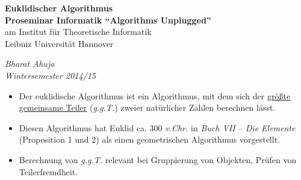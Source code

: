 \documentclass[12pt]{article}
\begin{document}
\begin{center}
\textbf{Euklidischer Algorithmus\\}
\textbf{Proseminar Informatik ``Algorithms Unplugged''}\\
am Institut f\"ur Theoretische Informatik\\
Leibniz Universit\"at Hannover\\
\end{center}
\begin{flushright}
\textit{Bharat Ahuja\\Wintersemester 2014/15}
\end{flushright}

\noindent\makebox[\linewidth]{\rule{\paperwidth}{0.4pt}}
\vspace{10pt}
\begin{itemize}
	\item  Der euklidische Algorithmus ist ein Algorithmus, mit dem sich der \underline{gr\"o{\ss}te gemeinsame Teiler} (\textit{g.g.T.}) zweier nat\"urlicher Zahlen berechnen l\"asst. 
	\item Diesen Algorithmus hat Euklid ca. 300 \textit{v.Chr.} in \textit{Buch VII -- Die Elemente} (Proposition 1 und 2) als einen geometrischen Algorithmus vorgestellt.
	\item Berechnung von \textit{g.g.T.} relevant bei Gruppierung von Objekten, Pr\"ufen von Teilerfremdheit.
 

\end{itemize}
\end{document}
